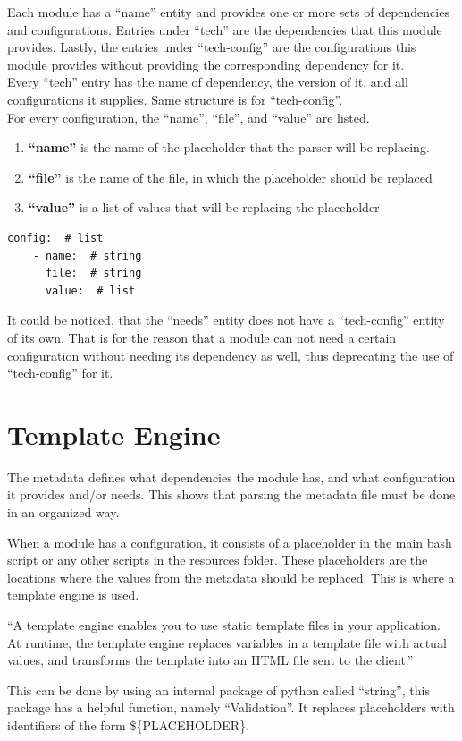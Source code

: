 Each module has a “name” entity and provides one or more sets of dependencies and configurations. Entries under “tech” are the dependencies that this module provides. Lastly, the entries under “tech-config” are the configurations this module provides without providing the corresponding dependency for it.\\
Every “tech” entry has the name of dependency, the version of it, and all configurations it supplies. Same structure is for “tech-config”.\\
For every configuration, the “name”, “file”, and “value” are listed.
\begin{enumerate}
  \item \textbf{“name”} is the name of the placeholder that the parser will be replacing.
  \item \textbf{“file”} is the name of the file, in which the placeholder should be replaced
  \item \textbf{“value”} is a list of values that will be replacing the placeholder
\end{enumerate}

\begin{lstlisting}[caption=YAML Schema, style=pythonstyle]
config:  # list
    - name:  # string
      file:  # string
      value:  # list
\end{lstlisting}
It could be noticed, that the “needs” entity does not have a “tech-config” entity of its own. That is for the reason that a module can not need a certain configuration without needing its dependency as well, thus deprecating the use of “tech-config” for it.


\section{Template Engine}
The metadata defines what dependencies the module has, and what configuration it provides and/or needs. This shows that parsing the metadata file must be done in an organized way.

When a module has a configuration, it consists of a placeholder in the main bash script or any other scripts in the resources folder. These placeholders are the locations where the values from the metadata should be replaced. This is where a template engine is used.

“A template engine enables you to use static template files in your application. At runtime, the template engine replaces variables in a template file with actual values, and transforms the template into an HTML file sent to the client.”\cite{template}

This can be done by using an internal package of python called “string”, this package has a helpful function, namely “Validation”\cite{string}. It replaces placeholders with identifiers of the form \$\{PLACEHOLDER\}.
